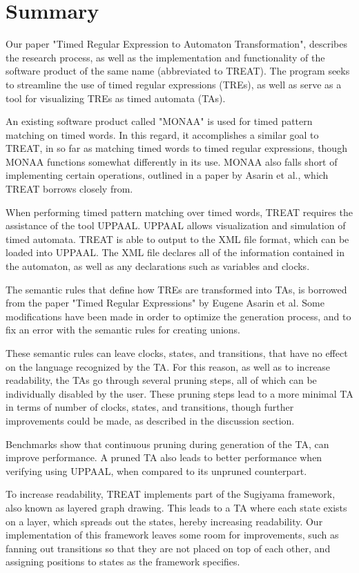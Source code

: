 \section*{Summary}
\thispagestyle{empty}

Our paper "Timed Regular Expression to Automaton Transformation", describes the research process, as well as the implementation and functionality of the software product of the same name (abbreviated to TREAT).
The program seeks to streamline the use of timed regular expressions (TREs), as well as serve as a tool for visualizing TREs as timed automata (TAs).

An existing software product called "MONAA" is used for timed pattern matching on timed words. In this regard, it accomplishes a similar goal to TREAT, in so far as matching timed words to timed regular expressions, though MONAA functions somewhat differently in its use.
MONAA also falls short of implementing certain operations, outlined in a paper by Asarin et al., which TREAT borrows closely from.

When performing timed pattern matching over timed words, TREAT requires the assistance of the tool UPPAAL. UPPAAL allows visualization and simulation of timed automata.
TREAT is able to output to the XML file format, which can be loaded into UPPAAL. The XML file declares all of the information contained in the automaton, as well as any declarations such as variables and clocks.

The semantic rules that define how TREs are transformed into TAs, is borrowed from the paper "Timed Regular Expressions" by Eugene Asarin et al. Some modifications have been made in order to optimize the generation process, and to fix an error with the semantic rules for creating unions.

These semantic rules can leave clocks, states, and transitions, that have no effect on the language recognized by the TA. For this reason, as well as to increase readability, the TAs go through several pruning steps, all of which can be individually disabled by the user.
These pruning steps lead to a more minimal TA in terms of number of clocks, states, and transitions, though further improvements could be made, as described in the discussion section.

Benchmarks show that continuous pruning during generation of the TA, can improve performance. A pruned TA also leads to better performance when verifying using UPPAAL, when compared to its unpruned counterpart.

To increase readability, TREAT implements part of the Sugiyama framework, also known as layered graph drawing. This leads to a TA where each state exists on a layer, which spreads out the states, hereby increasing readability. Our implementation of this framework leaves some room for improvements, such as fanning out transitions so that they are not placed on top of each other, and assigning positions to states as the framework specifies.

